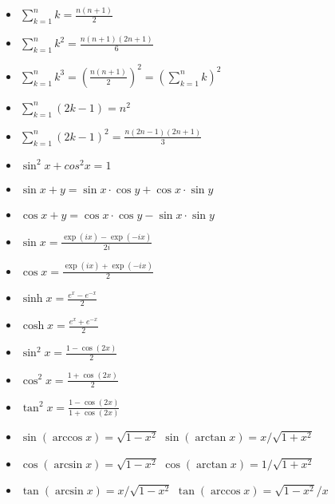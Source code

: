   \begin{example} $ $
  	\begin{itemize}
        \item $\sum_{k=1}^{n}k = \frac{n(n+1)}{2}$
		\item $\sum_{k=1}^{n}k^2 = \frac{n(n+1)(2n+1)}{6}$
		\item $\sum_{k=1}^{n}k^3 = (\frac{n(n+1)}{2})^2= (\sum_{k=1}^{n}k)^2$
		\item $\sum_{k=1}^{n}(2k-1) = n^2$
		\item $\sum_{k=1}^{n}(2k-1)^2 = \frac{n(2n-1)(2n+1)}{3}$
        \item $ \sin^2 x + cos^2x = 1 $
		\item $ \sin x+y = \sin x \cdot \cos y + \cos x \cdot \sin y $
		\item $ \cos x+y = \cos x \cdot \cos y - \sin x \cdot \sin y $
        \item $ \sin x = \frac{\exp{(ix)} - \exp {(-ix)}}{2i} $
        \item $ \cos x = \frac{\exp{(ix)} + \exp{(-ix)}}{2} $
        \item $ \sinh{x} = \frac{e^x - e^{-x}}{2} $
        \item $ \cosh{x} = \frac{e^x + e^{-x}}{2} $
        \item $ \sin^2{x} = \frac{1 - \cos{(2x)}}{2} $
        \item $ \cos^2{x} = \frac{1 + \cos{(2x)}}{2} $
        \item $ \tan^2{x} = \frac{1 - \cos{(2x)}}{1 + \cos{(2x)}} $
        \item $ \sin(\arccos x) = \sqrt{1-x^2} $ \tab $ \sin(\arctan x) = x/\sqrt{1+x^2} $
        \item $ \cos(\arcsin x) = \sqrt{1-x^2} $ \tab $ \cos(\arctan x) = 1 / \sqrt{1+x^2} $
        \item $ \tan(\arcsin x) = x/\sqrt{1-x^2} $ \tab $ \tan(\arccos x) = \sqrt{1-x^2}/x $
  	\end{itemize}
  \end{example}
  
